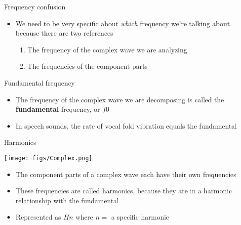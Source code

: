 \documentclass[professionalfonts]{beamer}
\begin{document}
\begin{frame}{Frequency confusion}
    \begin{itemize}
        \item We need to be very specific about \textit{which} frequency we’re talking about because there are two references
        \begin{enumerate}
            \item The frequency of the complex wave we are analyzing
            \item The frequencies of the component parts
        \end{enumerate}
    \end{itemize}
\end{frame}

\begin{frame}{Fundamental frequency}
    \begin{itemize}
        \item The frequency of the complex wave we are decomposing is called the \textbf{fundamental} frequency, or $f0$
        \item In speech sounds, the rate of vocal fold vibration equals the fundamental
    \end{itemize}
\end{frame}

\begin{frame}{Harmonics}
    \begin{multicols}{2}
        \texttt{[image: figs/Complex.png]}

        \columnbreak

        \begin{itemize}
            \item The component parts of a complex wave each have their own frequencies
            \item These frequencies are called harmonics, because they are in a harmonic relationship with the fundamental
            \item Represented as $Hn$ where $n =$ a specific harmonic
        \end{itemize}
    \end{multicols}
\end{frame}
\end{document}

